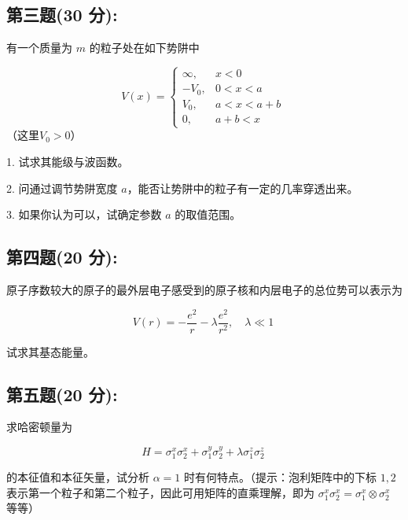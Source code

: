 \subsection{第三题(30 分):}
有一个质量为 \(m\) 的粒子处在如下势阱中

\[
V(x) = 
\begin{cases} 
\infty, & x < 0 \\
-V_0, & 0 < x < a \\
V_0, & a < x < a + b \\
0, & a + b < x
\end{cases}
~\]
（这里$V_0 > 0$）

1. 试求其能级与波函数。

2. 问通过调节势阱宽度 \(a\)，能否让势阱中的粒子有一定的几率穿透出来。

3. 如果你认为可以，试确定参数 \(a\) 的取值范围。
\subsection{第四题(20 分):}
原子序数较大的原子的最外层电子感受到的原子核和内层电子的总位势可以表示为

\[V(r) = -\frac{e^2}{r} - \lambda \frac{e^2}{r^2}, \quad \lambda \ll 1~\]

试求其基态能量。
\subsection{第五题(20 分):}
求哈密顿量为

\[H = \sigma_1^x \sigma_2^x + \sigma_1^y \sigma_2^y + \lambda \sigma_1^z \sigma_2^z~\]

的本征值和本征矢量，试分析 $\alpha = 1$ 时有何特点。（提示：泡利矩阵中的下标 $1, 2$ 表示第一个粒子和第二个粒子，因此可用矩阵的直乘理解，即为 $\sigma_1^x \sigma_2^x = \sigma_1^x \otimes \sigma_2^x$ 等等）